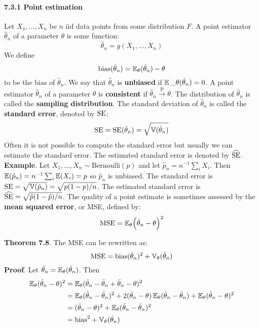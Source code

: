 \paragraph{7.3.1 Point estimation}\label{point-estimation}
Let \(X_{1}, \dots, X_{n}\) be \(n\) iid data points from some distribution
\(F\). A point estimator \(\hat{\theta}_{n}\) of a parameter \(\theta\) is
some function:
\[
\hat{\theta}_{n} = g(X_{1}, \dots, X_{n})
\]
We define
\[
\text{bias}(\hat{\theta}_{n}) = \operatorname{\mathbb{E}}_{\theta}(\hat{\theta}_{n}) - \theta
\]
to be the bias of \(\hat{\theta}_{n}\). We say that \(\hat{\theta}_{n}\) is
\textbf{unbiased} if $ \operatorname{\mathbb{E}}\_\theta(\hat{\theta}_{n}) = 0 $.
A point estimator \(\hat{\theta}_{n}\) of a parameter \(\theta\) is
\textbf{consistent} if \(\hat{\theta}_{n} \xrightarrow{\textrm{P}} \theta\).
The distribution of \(\hat{\theta}_{n}\) is called the \textbf{sampling
distribution}.
The standard deviation of \(\hat{\theta}_{n}\) is called the
\textbf{standard error}, denoted by \(\operatorname{\mathrm{SE}} \):
\[
\operatorname{\mathrm{SE}} = \operatorname{\mathrm{SE}} (\hat{\theta}_{n}) = \sqrt{\operatorname{\mathbb{V}}(\hat{\theta}_{n})}
\]
Often it is not possible to compute the standard error but usually we
can estimate the standard error. The estimated standard error is denoted
by \(\widehat{\operatorname{\mathrm{SE}}}\).
\textbf{Example}. Let \(X_{1}, \dots, X_{n} \sim \text{Bernoulli}(p)\) and
let \(\hat{p}_{n} = n^{-1} \sum_{i} X_{i}\). Then
\(\operatorname{\mathbb{E}}(\hat{p}_{n}) = n^{-1} \sum_{i} \operatorname{\mathbb{E}}(X_{i}) = p\) so
\(\hat{p}_{n}\) is unbiased. The standard error is
\(\operatorname{\mathrm{SE}} = \sqrt{\operatorname{\mathbb{V}}(\hat{p}_{n})} = \sqrt{p(1-p)/n}\). The
estimated standard error is
\(\widehat{\operatorname{\mathrm{SE}}} = \sqrt{\hat{p}(1 - \hat{p})/n}\).
The quality of a point estimate is sometimes assessed by the
\textbf{mean squared error}, or MSE, defined by:
\[
\MSE = \EXP_{\theta} \left( \hat{\theta}_{n} - \theta \right)^{2}
\]

\textbf{Theorem 7.8}. The MSE can be rewritten as:
\[
\operatorname{\mathrm{MSE}} = \text{bias}(\hat{\theta}_{n})^{2} + \operatorname{\mathbb{V}}_\theta(\hat{\theta}_{n})
\]
\textbf{Proof}. Let
\(\bar{\theta}_{n} = \operatorname{\mathbb{E}}_{\theta}(\hat{\theta}_{n})\). Then
\begin{align*}
\operatorname{\mathbb{E}}_{\theta}(\hat{\theta}_{n} - \theta)^{2} & = \operatorname{\mathbb{E}}_{\theta}(\hat{\theta}_{n} - \bar{\theta}_{n} + \bar{\theta}_{n} - \theta)^{2} \\
&=  \operatorname{\mathbb{E}}_{\theta}(\hat{\theta}_{n} - \bar{\theta}_{n})^{2}
  + 2 (\bar{\theta}_{n} - \theta) \operatorname{\mathbb{E}}_{\theta}(\hat{\theta}_{n} - \bar{\theta}_{n})
  + \operatorname{\mathbb{E}}_{\theta}(\hat{\theta}_{n} - \theta)^{2} \\
&= (\bar{\theta}_{n} - \theta)^{2} + \operatorname{\mathbb{E}}_{\theta}(\hat{\theta}_{n} - \bar{\theta}_{n})^{2} \\
&= \text{bias}^{2} + \operatorname{\mathbb{V}}_\theta(\hat{\theta}_{n})
\end{align*}

